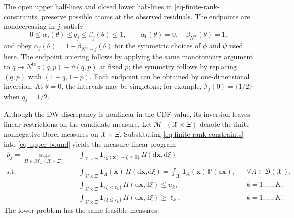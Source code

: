 The open upper half-lines and closed lower half-lines in \eqref{eq-finite-rank-constraints} preserve possible atoms at the observed residuals. The endpoints are nondecreasing in $j$, satisfy
\[
  0\le\alpha_j(\theta)\le q_j\le\beta_j(\theta)\le1,
  \qquad
  \alpha_0(\theta)=0,\quad\beta_{N^{\mathrm{te}}}(\theta)=1,
\]
and obey $\alpha_j(\theta)=1-\beta_{N^{\mathrm{te}}-j}(\theta)$ for the symmetric choices of $\phi$ and $\psi$ used here. The endpoint ordering follows by applying the same monotonicity argument to $q\mapsto N^{\mathrm{te}}\phi(q,p)-\psi(q,p)$ at fixed $p$; the symmetry follows by replacing $(q,p)$ with $(1-q,1-p)$. Each endpoint can be obtained by one-dimensional inversion. At $\theta=0$, the intervals may be singletons; for example, $\mathcal I_j(0)=\{1/2\}$ when $q_j=1/2$.

Although the DW discrepancy is nonlinear in the CDF value, its inversion leaves linear restrictions on the candidate measure. Let $\mathcal M_+(\mathcal X\times\Xi)$ denote the finite nonnegative Borel measures on $\mathcal X\times\Xi$. Substituting \eqref{eq-finite-rank-constraints} into \eqref{eq-upper-bound} yields the measure linear program
\begin{equation}
  \begin{aligned}
    \overline p_{\hat f}
    =\sup_{\Pi\in\mathcal M_+(\mathcal X\times\Xi)}\quad&
    \int_{\mathcal X\times\Xi}
    \mathbf1_{\{\hat g(\bm x)+\xi\le0\}}\,\Pi\left(\mathrm d\bm x,\mathrm d\xi\right)\\
    \text{s.t.}\quad&
    \int_{\mathcal X\times\Xi}\mathbf1_A(\bm x)\,\Pi\left(\mathrm d\bm x,\mathrm d\xi\right)
    =\int_{\mathcal X}\mathbf1_A(\bm x)\,\mathbb P\left(\mathrm d\bm x\right),
    &&\forall A\in\mathcal B(\mathcal X),\\
    &\int_{\mathcal X\times\Xi}
    \mathbf1_{\{\xi<r_k\}}\,\Pi\left(\mathrm d\bm x,\mathrm d\xi\right)\le u_k,
    &&k=1,\ldots,K,\\
    &\int_{\mathcal X\times\Xi}
    \mathbf1_{\{\xi\le r_k\}}\,\Pi\left(\mathrm d\bm x,\mathrm d\xi\right)\ge\ell_k,
    &&k=1,\ldots,K.
  \end{aligned}
  \label{eq-measure-upper}
\end{equation}
The lower problem has the same feasible measures:

